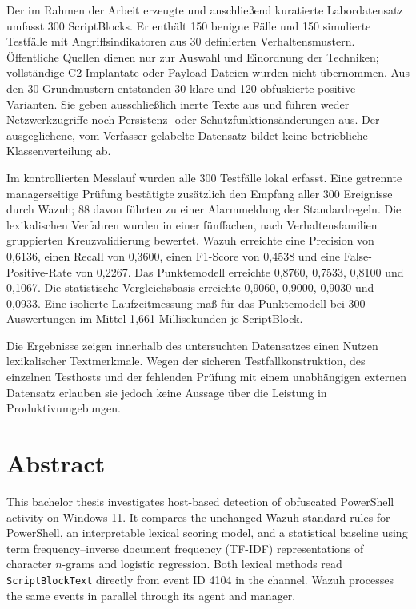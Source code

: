 \documentclass[12pt,a4paper,oneside,parskip=half]{scrreprt}
\begin{document}
Der im Rahmen der Arbeit erzeugte und anschließend kuratierte Labordatensatz umfasst 300 ScriptBlocks. Er enthält 150 benigne Fälle und 150 simulierte Testfälle mit Angriffsindikatoren aus 30 definierten Verhaltensmustern. Öffentliche Quellen dienen nur zur Auswahl und Einordnung der Techniken; vollständige C2-Implantate oder Payload-Dateien wurden nicht übernommen. Aus den 30 Grundmustern entstanden 30 klare und 120 obfuskierte positive Varianten. Sie geben ausschließlich inerte Texte aus und führen weder Netzwerkzugriffe noch Persistenz- oder Schutzfunktionsänderungen aus. Der ausgeglichene, vom Verfasser gelabelte Datensatz bildet keine betriebliche Klassenverteilung ab.

Im kontrollierten Messlauf wurden alle 300 Testfälle lokal erfasst. Eine getrennte managerseitige Prüfung bestätigte zusätzlich den Empfang aller 300 Ereignisse durch Wazuh; 88 davon führten zu einer Alarmmeldung der Standardregeln. Die lexikalischen Verfahren wurden in einer fünffachen, nach Verhaltensfamilien gruppierten Kreuzvalidierung bewertet. Wazuh erreichte eine Precision von 0{,}6136, einen Recall von 0{,}3600, einen F1-Score von 0{,}4538 und eine False-Positive-Rate von 0{,}2267. Das Punktemodell erreichte 0{,}8760, 0{,}7533, 0{,}8100 und 0{,}1067. Die statistische Vergleichsbasis erreichte 0{,}9060, 0{,}9000, 0{,}9030 und 0{,}0933. Eine isolierte Laufzeitmessung maß für das Punktemodell bei 300 Auswertungen im Mittel 1{,}661 Millisekunden je ScriptBlock.

Die Ergebnisse zeigen innerhalb des untersuchten Datensatzes einen Nutzen lexikalischer Textmerkmale. Wegen der sicheren Testfallkonstruktion, des einzelnen Testhosts und der fehlenden Prüfung mit einem unabhängigen externen Datensatz erlauben sie jedoch keine Aussage über die Leistung in Produktivumgebungen.
\clearpage

\chapter*{Abstract}
This bachelor thesis investigates host-based detection of obfuscated PowerShell activity on Windows 11. It compares the unchanged Wazuh standard rules for PowerShell, an interpretable lexical scoring model, and a statistical baseline using term frequency--inverse document frequency (TF-IDF) representations of character \(n\)-grams and logistic regression. Both lexical methods read \texttt{ScriptBlockText} directly from event ID 4104 in the  channel. Wazuh processes the same events in parallel through its agent and manager.
\end{document}
